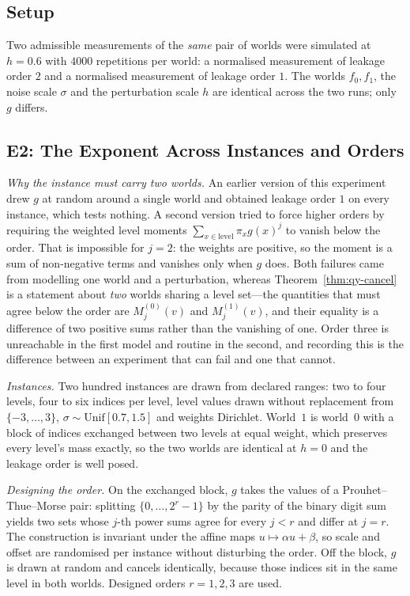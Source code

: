 \documentclass[conference]{IEEEtran}
\theoremstyle{definition}
\begin{document}
\subsection{Setup}

Two admissible measurements of the \emph{same} pair of worlds were simulated at $h=0.6$ with
$4000$ repetitions per world: a normalised measurement of leakage order $2$ and a normalised
measurement of leakage order $1$. The worlds $f_{0},f_{1}$, the noise scale $\sigma$ and the
perturbation scale $h$ are identical across the two runs; only $g$ differs.

\subsection{E2: The Exponent Across Instances and Orders}
\label{sec:qy-e2}

\emph{Why the instance must carry two worlds.} An earlier version of this experiment drew $g$
at random around a single world and obtained leakage order $1$ on every instance, which tests
nothing. A second version tried to force higher orders by requiring the weighted level moments
$\sum_{x\in\text{level}}\pi_{x}g(x)^{j}$ to vanish below the order. That is impossible for
$j=2$: the weights are positive, so the moment is a sum of non-negative terms and vanishes
only when $g$ does. Both failures came from modelling one world and a perturbation, whereas
Theorem~\ref{thm:qy-cancel} is a statement about \emph{two} worlds sharing a level set---the
quantities that must agree below the order are $M^{(0)}_{j}(v)$ and $M^{(1)}_{j}(v)$, and
their equality is a difference of two positive sums rather than the vanishing of one. Order
three is unreachable in the first model and routine in the second, and recording this is the
difference between an experiment that can fail and one that cannot.

\emph{Instances.} Two hundred instances are drawn from declared ranges: two to four levels,
four to six indices per level, level values drawn without replacement from
$\{-3,\dots,3\}$, $\sigma\sim\mathrm{Unif}[0.7,1.5]$ and weights Dirichlet. World~$1$ is
world~$0$ with a block of indices exchanged between two levels at equal weight, which
preserves every level's mass exactly, so the two worlds are identical at $h=0$ and the
leakage order is well posed.

\emph{Designing the order.} On the exchanged block, $g$ takes the values of a
Prouhet--Thue--Morse pair: splitting $\{0,\dots,2^{r}-1\}$ by the parity of the binary digit
sum yields two sets whose $j$-th power sums agree for every $j<r$ and differ at $j=r$. The
construction is invariant under the affine maps $u\mapsto\alpha u+\beta$, so scale and offset
are randomised per instance without disturbing the order. Off the block, $g$ is drawn at
random and cancels identically, because those indices sit in the same level in both worlds.
Designed orders $r=1,2,3$ are used.
\end{document}
